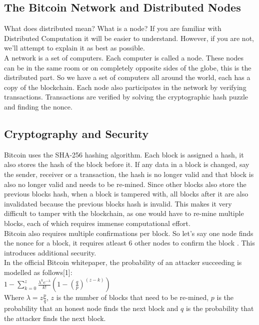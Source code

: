 \documentclass[11pt]{article} %
\begin{document}
\subsection{The Bitcoin Network and Distributed Nodes}{}
What does distributed mean? What is a node? If you are familiar with Distributed Computation it will be easier to understand. However, if you are not, we'll attempt to explain it as best as possible. \\

\noindent A network is a set of computers. Each computer is called a node. These nodes can be in the same room or on completely opposite sides of the globe, this is the distributed part. So we have a set of computers all around the world, each has a copy of the blockchain. Each node also participates in the network by verifying transactions. Transactions are verified by solving the cryptographic hash puzzle and finding the nonce.

\subsection{Cryptography and Security}{}
Bitcoin uses the SHA-256 hashing algorithm. Each block is assigned a hash, it also stores the hash of the block before it. If any data in a block is changed, say the sender, receiver or a transaction, the hash is no longer valid and that block is also no longer valid and needs to be re-mined. Since other blocks also store the previous blocks hash, when a block is tampered with, all blocks after it are also invalidated because the previous blocks hash is invalid. This makes it very difficult to tamper with the blockchain, as one would have to re-mine multiple blocks, each of which requires immense computational effort.\\

\noindent Bitcoin also requires multiple confirmations per block. So let's say one node finds the nonce for a block, it requires atleast 6 other nodes to confirm the block \cite{11}. This introduces additional security.\\

\noindent In the official Bitcoin whitepaper, the probability of an attacker succeeding is modelled as follows[1]:\\

$1 - \sum_{k=0}^{z} \frac{ \lambda^{k} e^{-\lambda} } {k!} (1 - ({\frac{q}{p}}) ^ {(z-k)})$\\

Where $\lambda = z \frac{p}{q}$, $z$ is the number of blocks that need to be re-mined, $p$ is the probability that an honest node finds the next block and $q$ is the probability that the attacker finds the next block.\\
\end{document}

